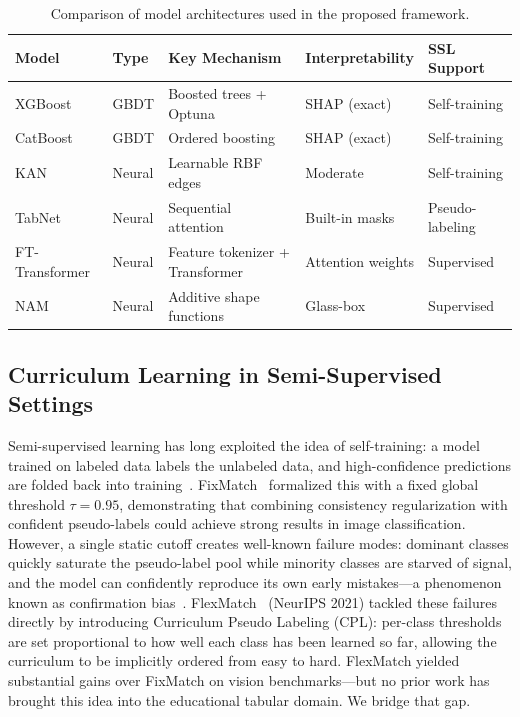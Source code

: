 \documentclass[journal, onecolumn]{IEEEtran}
\begin{document}
\begin{table}[!htbp]
\centering
\small
\caption{Comparison of model architectures used in the proposed framework.}
\label{tab:model_comparison}
\begin{tabular}{@{}p{2.8cm}p{2.5cm}p{3.2cm}p{2.5cm}p{2.5cm}@{}}
\toprule
\textbf{Model} & \textbf{Type} & \textbf{Key Mechanism} & \textbf{Interpretability} & \textbf{SSL Support} \\
\midrule
XGBoost & GBDT & Boosted trees + Optuna & SHAP (exact) & Self-training \\
CatBoost & GBDT & Ordered boosting & SHAP (exact) & Self-training \\
KAN & Neural & Learnable RBF edges & Moderate & Self-training \\
TabNet & Neural & Sequential attention & Built-in masks & Pseudo-labeling \\
FT-Transformer & Neural & Feature tokenizer + Transformer & Attention weights & Supervised \\
NAM & Neural & Additive shape functions & Glass-box & Supervised \\
\bottomrule
\end{tabular}
\end{table}

\subsection{Curriculum Learning in Semi-Supervised Settings}

Semi-supervised learning has long exploited the idea of self-training: a model trained on labeled data labels the unlabeled data, and high-confidence predictions are folded back into training~\cite{yarowsky1995unsupervised,lee2013pseudo}. FixMatch~\cite{sohn2020fixmatch} formalized this with a fixed global threshold $\tau = 0.95$, demonstrating that combining consistency regularization with confident pseudo-labels could achieve strong results in image classification. However, a single static cutoff creates well-known failure modes: dominant classes quickly saturate the pseudo-label pool while minority classes are starved  of signal, and the model can confidently reproduce its own early mistakes---a phenomenon known as confirmation bias~\cite{arazo2020pseudo}. FlexMatch~\cite{zhang2021flexmatch} (NeurIPS 2021) tackled these failures directly by introducing Curriculum Pseudo Labeling (CPL): per-class thresholds are set proportional to how well each class has been learned so far, allowing the curriculum to be implicitly ordered from easy to hard. FlexMatch yielded substantial gains over FixMatch on vision benchmarks---but no prior work has brought this idea into the educational tabular domain. We bridge that gap.
\end{document}
